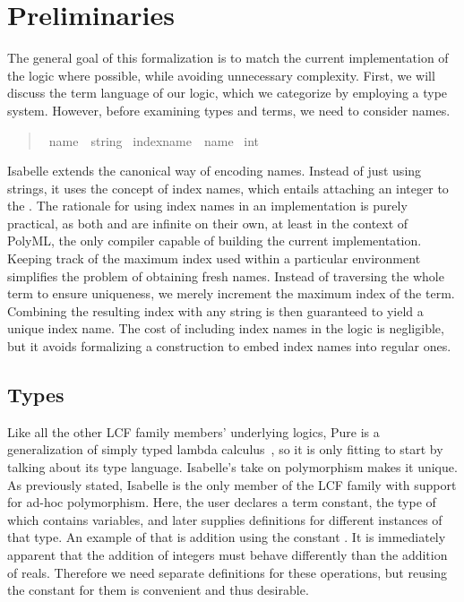 \chapter{Preliminaries}\label{chapter:preliminaries}

The general goal of this formalization is to match the current implementation of the logic where possible, while avoiding unnecessary complexity.
First, we will discuss the term language of our logic, which we categorize by employing a type system.
However, before examining types and terms, we need to consider names.

\begin{quote}
    \begin{isabelle}
        \ name\ {\isacharequal}\ string \isanewline
        \ indexname\ {\isacharequal}\ name {\isasymtimes}\ int
    \end{isabelle}
\end{quote}

Isabelle extends the canonical way of encoding names.
Instead of just using strings, it uses the concept of index names, which entails attaching an integer to the .
The rationale for using index names in an implementation is purely practical, as both  and  are infinite on their own, at least in the context of PolyML, the only compiler capable of building the current implementation.
Keeping track of the maximum index used within a particular environment simplifies the problem of obtaining fresh names.
Instead of traversing the whole term to ensure uniqueness, we merely increment the maximum index of the term.
Combining the resulting index with any string is then guaranteed to yield a unique index name.
The cost of including index names in the logic is negligible, but it avoids formalizing a construction to embed index names into regular ones.

\section{Types}
Like all the other LCF family members' underlying logics, Pure is a generalization of simply typed lambda calculus~\parencite{Church40}, so it is only fitting to start by talking about its type language.
Isabelle's take on polymorphism makes it unique.
As previously stated, Isabelle is the only member of the LCF family with support for ad-hoc polymorphism.
Here, the user declares a term constant, the type of which contains variables, and later supplies definitions for different instances of that type.
An example of that is addition using the constant .
It is immediately apparent that the addition of integers must behave differently than the addition of reals.
Therefore we need separate definitions for these operations, but reusing the \isa{(+)} constant for them is convenient and thus desirable.

